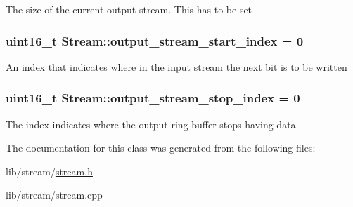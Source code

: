 The size of the current output stream. This has to be set \hypertarget{class_stream_a7406f5db92c18f0a6d7dcc924a6122cc}{
\subsubsection[{output\-\_\-stream\-\_\-start\-\_\-index}]{\setlength{\rightskip}{0pt plus 5cm}uint16\-\_\-t Stream\-::output\-\_\-stream\-\_\-start\-\_\-index = 0\hspace{0.3cm}{\ttfamily [protected]}}}\label{class_stream_a7406f5db92c18f0a6d7dcc924a6122cc}
An index that indicates where in the input stream the next bit is to be written \hypertarget{class_stream_ac3b2282b5977151124aa77c2d4e411ec}{
\subsubsection[{output\-\_\-stream\-\_\-stop\-\_\-index}]{\setlength{\rightskip}{0pt plus 5cm}uint16\-\_\-t Stream\-::output\-\_\-stream\-\_\-stop\-\_\-index = 0\hspace{0.3cm}{\ttfamily [protected]}}}\label{class_stream_ac3b2282b5977151124aa77c2d4e411ec}
The index indicates where the output ring buffer stops having data 

The documentation for this class was generated from the following files\-:\begin{DoxyCompactItemize}
\item 
lib/stream/\hyperlink{stream_8h}{stream.\-h}\item 
lib/stream/stream.\-cpp\end{DoxyCompactItemize}
